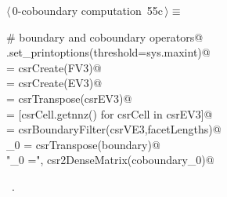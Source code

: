 \documentclass[11pt,oneside]{article}    %
\begin{document}
\begin{flushleft} \small \label{scrap94}
\protect{}$\langle\,$0-coboundary computation\nobreak\ {\footnotesize 55c}$\,\rangle\equiv$
\vspace{-1ex}
\begin{list}{}{} \item
\mbox{}\verb@# boundary and coboundary operators@\\
\mbox{}\verb@np.set_printoptions(threshold=sys.maxint)@\\
\mbox{} = csrCreate(FV3)@\\
\mbox{} = csrCreate(EV3)@\\
\mbox{} = csrTranspose(csrEV3)@\\
\mbox{}\verb@facetLengths = [csrCell.getnnz() for csrCell in csrEV3]@\\
\mbox{}\verb@boundary = csrBoundaryFilter(csrVE3,facetLengths)@\\
\mbox{}\verb@coboundary_0 = csrTranspose(boundary)@\\
\mbox{}\verb@print "\ncoboundary_0 =\n", csr2DenseMatrix(coboundary_0)@\\
\mbox{}\verb@@{\NWsep}
\end{list}
\vspace{-1ex}
\footnotesize\addtolength{\baselineskip}{-1ex}
\begin{list}{}{\setlength{\itemsep}{-\parsep}\setlength{\itemindent}{-\leftmargin}}
\item \NWtxtMacroRefIn\ .
\end{list}
\end{flushleft}
\end{document}

